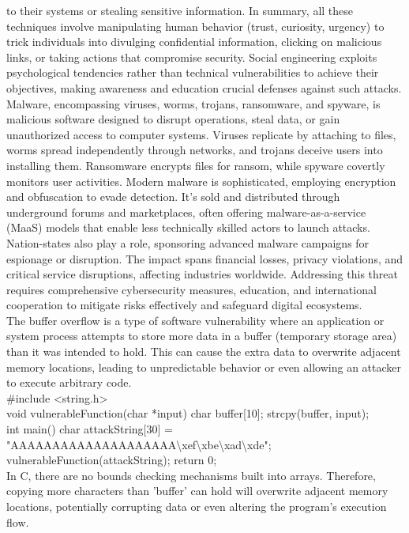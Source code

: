 \documentclass{article}
\begin{document}
to their systems or stealing sensitive information. In summary, all these techniques involve manipulating human behavior (trust, curiosity, urgency) to trick individuals into divulging confidential information, clicking on malicious links, or taking actions that compromise security. Social engineering exploits psychological tendencies rather than technical vulnerabilities to achieve their objectives, making awareness and education crucial defenses against such attacks. Malware, encompassing viruses, worms, trojans, ransomware, and spyware, is malicious software designed to disrupt operations, steal data, or gain unauthorized access to computer systems. Viruses replicate by attaching to files, worms spread independently through networks, and trojans deceive users into installing them. Ransomware encrypts files for ransom, while spyware covertly monitors user activities. Modern malware is sophisticated, employing encryption and obfuscation to evade detection. It's sold and distributed through underground forums and marketplaces, often offering malware-as-a-service (MaaS) models that enable less technically skilled actors to launch attacks. Nation-states also play a role, sponsoring advanced malware campaigns for espionage or disruption. The impact spans financial losses, privacy violations, and critical service disruptions, affecting industries worldwide. Addressing this threat requires comprehensive cybersecurity measures, education, and international cooperation to mitigate risks effectively and safeguard digital ecosystems.\\
	
	The buffer overflow is a type of software vulnerability where an application or system process attempts to store more data in a buffer (temporary storage area) than it was intended to hold. This can cause the extra data to overwrite adjacent memory locations, leading to unpredictable behavior or even allowing an attacker to execute arbitrary code.\\
	
	\#include \textless string.h\textgreater\\
	void vulnerableFunction(char *input) {char buffer[10]; strcpy(buffer, input);}\\
	int main() {char attackString[30] = "AAAAAAAAAAAAAAAAAAAA\textbackslash{}xef\textbackslash{}xbe\textbackslash{}xad\textbackslash{}xde"; vulnerableFunction(attackString); return 0;}\\
	
	In C, there are no bounds checking mechanisms built into arrays. Therefore, copying more characters than 'buffer' can hold will overwrite adjacent memory locations, potentially corrupting data or even altering the program's execution flow.\\
	
\end{document}
